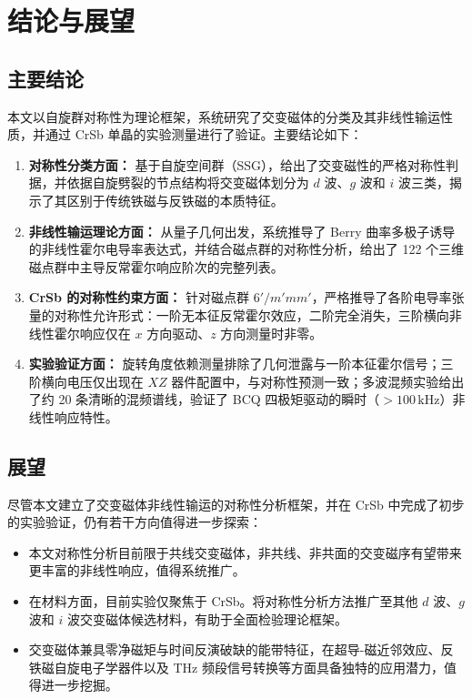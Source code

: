 ﻿%

\chapter{结论与展望}
\label{chap:conclusion}

\section{主要结论}

本文以自旋群对称性为理论框架，系统研究了交变磁体的分类及其非线性输运性质，并通过 CrSb 单晶的实验测量进行了验证。主要结论如下：

\begin{enumerate}
  \item \textbf{对称性分类方面：} 基于自旋空间群（SSG），给出了交变磁性的严格对称性判据，并依据自旋劈裂的节点结构将交变磁体划分为 $d$ 波、$g$ 波和 $i$ 波三类，揭示了其区别于传统铁磁与反铁磁的本质特征。
  \item \textbf{非线性输运理论方面：} 从量子几何出发，系统推导了 Berry 曲率多极子诱导的非线性霍尔电导率表达式，并结合磁点群的对称性分析，给出了 122 个三维磁点群中主导反常霍尔响应阶次的完整列表。
  \item \textbf{CrSb 的对称性约束方面：} 针对磁点群 $6'/m'mm'$，严格推导了各阶电导率张量的对称性允许形式：一阶无本征反常霍尔效应，二阶完全消失，三阶横向非线性霍尔响应仅在 $x$ 方向驱动、$z$ 方向测量时非零。
  \item \textbf{实验验证方面：} 旋转角度依赖测量排除了几何泄露与一阶本征霍尔信号；三阶横向电压仅出现在 $XZ$ 器件配置中，与对称性预测一致；多波混频实验给出了约 20 条清晰的混频谱线，验证了 BCQ 四极矩驱动的瞬时（$>100\,\mathrm{kHz}$）非线性响应特性。
\end{enumerate}

\section{展望}

尽管本文建立了交变磁体非线性输运的对称性分析框架，并在 CrSb 中完成了初步的实验验证，仍有若干方向值得进一步探索：

\begin{itemize}
  \item 本文对称性分析目前限于共线交变磁体，非共线、非共面的交变磁序有望带来更丰富的非线性响应，值得系统推广。
  \item 在材料方面，目前实验仅聚焦于 CrSb。将对称性分析方法推广至其他 $d$ 波、$g$ 波和 $i$ 波交变磁体候选材料，有助于全面检验理论框架。
  \item 交变磁体兼具零净磁矩与时间反演破缺的能带特征，在超导-磁近邻效应、反铁磁自旋电子学器件以及 THz 频段信号转换等方面具备独特的应用潜力，值得进一步挖掘。
\end{itemize}
